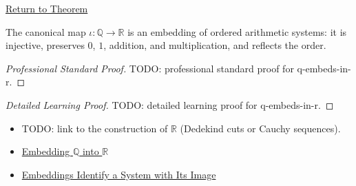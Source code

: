 \newpage
{}
\label{prf:q-embeds-in-r}

\begin{remark*}[Return]
\hyperref[thm:q-embeds-in-r]{Return to Theorem}
\end{remark*}

\begin{theorem*}[$Q$ Embeds in $R$]
The canonical map $\iota:\mathbb{Q}\to \mathbb{R}$ is an embedding of ordered arithmetic systems: it is injective, preserves $0$, $1$, addition, and multiplication, and reflects the order.
\end{theorem*}

\begin{proof}[Professional Standard Proof]
\LRAProofBodyStart
TODO: professional standard proof for q-embeds-in-r.
\end{proof}

\begin{proof}[Detailed Learning Proof]
\LRAProofBodyStart
TODO: detailed learning proof for q-embeds-in-r.
\end{proof}

\begin{remark*}
\end{remark*}

\begin{dependencies}
\begin{itemize}
  \item TODO: link to the construction of $\mathbb{R}$ (Dedekind cuts or Cauchy sequences).
  \item \hyperref[def:embedding-q-into-r]{Embedding $\mathbb{Q}$ into $\mathbb{R}$}
  \item \hyperref[thm:embedding-identifies-with-image]{Embeddings Identify a System with Its Image}
\end{itemize}
\end{dependencies}

\clearpage

